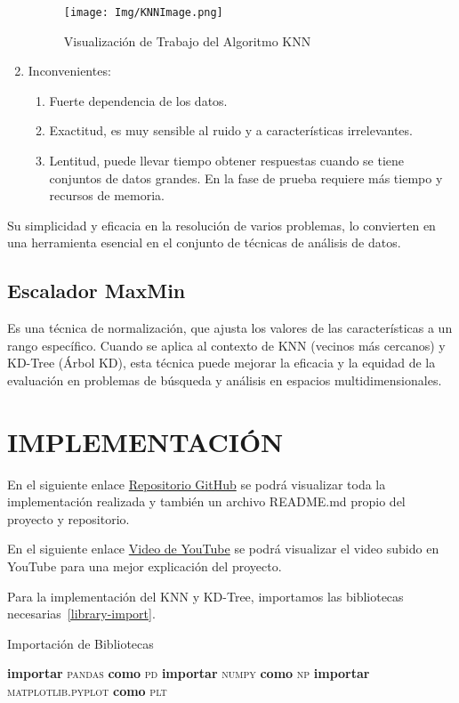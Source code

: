\documentclass{article}
\begin{document}
\begin{sloppypar}
\begin{enumerate}
    \begin{figure}[H]
    \centering
    \texttt{[image: Img/KNNImage.png]}
    \caption{\label{fig:funcionamientoKNN}Visualización de Trabajo del Algoritmo KNN}
    \end{figure}
    
    \item Inconvenientes:      
    \begin{enumerate}
       \item Fuerte dependencia de los datos.   
       \item Exactitud, es muy sensible al ruido y a características irrelevantes.
       \item Lentitud, puede llevar tiempo obtener respuestas cuando se tiene conjuntos de datos grandes. En la fase de prueba requiere más tiempo y recursos de memoria.
    \end{enumerate} 
\end{enumerate}

Su simplicidad y eficacia en la resolución de varios problemas, lo convierten en una herramienta esencial en el conjunto de técnicas de análisis de datos. \cite{GeorgeGaryStanley2009Algorithms}

\subsection{Escalador MaxMin}
Es una técnica de normalización, que ajusta los valores de las características a un rango específico. Cuando se aplica al contexto de KNN (vecinos más cercanos) y KD-Tree (Árbol KD), esta técnica puede mejorar la eficacia y la equidad de la evaluación en problemas de búsqueda y análisis en espacios multidimensionales.
\clearpage
\section{IMPLEMENTACIÓN}
En el siguiente enlace \href{https://github.com}{Repositorio GitHub} se podrá visualizar toda la implementación realizada y también un archivo README.md propio del proyecto y repositorio.
\vspace{0.7cm} 

En el siguiente enlace \href{https://github.com}{Video de YouTube} se podrá visualizar el video subido en YouTube para una mejor explicación del proyecto.

\vspace{0.7cm} 
Para la implementación del KNN y KD-Tree, importamos las bibliotecas necesarias~\ref{library-import}.
\begin{algorithm}[H]
\caption{Importación de Bibliotecas}
\label{library-import}
\begin{algorithmic}
\State \textbf{importar} \textsc{pandas} \textbf{como} \textsc{pd}
\State \textbf{importar} \textsc{numpy} \textbf{como} \textsc{np}
\State \textbf{importar} \textsc{matplotlib.pyplot} \textbf{como} \textsc{plt}
\end{algorithmic}
\end{algorithm}


\end{sloppypar}
\end{document}
